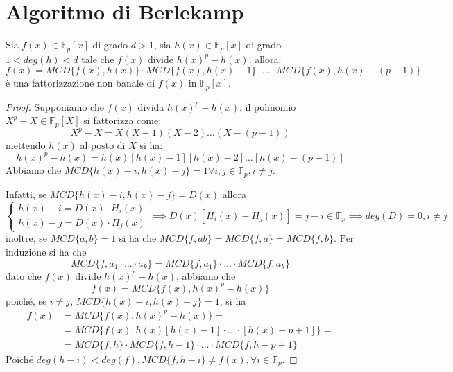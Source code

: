 \documentclass[10pt,a4paper,twoside]{book}
\begin{document}
\section{Algoritmo di Berlekamp}
\begin{theorem}
    Sia $f(x) \in \mathbb{F}_p[x]$ di grado $d > 1$, sia $h(x) \in \mathbb{F}_p[x]$ di grado $1 < deg(h) < d$ tale che $f(x)$ divide $h(x)^p - h(x)$. allora:
    \begin{equation*}
        f(x) = MCD\{f(x), h(x)\} \cdot MCD\{f(x), h(x) - 1\} \cdot \ldots \cdot MCD\{f(x), h(x) - (p - 1)\}
    \end{equation*}
    è una fattorizzazione non banale di $f(x)$ in $\mathbb{F}_p[x]$.
\end{theorem}
\begin{proof}
    Supponiamo che $f(x)$ divida $h(x)^p - h(x)$. il polinomio $X^p - X \in \mathbb{F}_p[X]$ si fattorizza come:
    \begin{equation*}
        X^p - X = X(X - 1)(X - 2)\ldots(X - (p - 1))
    \end{equation*}
    mettendo $h(x)$ al posto di $X$ si ha:
    \begin{equation*}
        h(x)^p - h(x) = h(x)[h(x) - 1][h(x) - 2]\ldots[h(x) - (p - 1)]
    \end{equation*}
    Abbiamo che $MCD\{ h(x) - i, h(x) - j\} = 1 \forall i,j \in \mathbb{F}_p, i \neq j$.

    Infatti, se $MCD\{ h(x) - i, h(x) - j\} = D(x)$ allora
    \begin{equation*}
        \begin{cases}
            h(x) - i = D(x) \cdot H_i(x) \\
            h(x) - j = D(x) \cdot H_j(x)
        \end{cases}
        \implies D(x)[H_i(x) - H_j(x)] = j - i \in \mathbb{F}_p
        \implies deg(D) = 0, i \neq j
    \end{equation*}
    inoltre, se $ MCD\{ a, b\} = 1$ si ha che $MCD\{ f, ab\} = MCD\{ f, a\} = MCD\{ f, b\} $. Per induzione si ha che
    \begin{equation*}
        MCD\{ f, a_1 \cdot \ldots \cdot a_k\} = MCD\{ f, a_1\} \cdot \ldots \cdot MCD\{ f, a_k\}
    \end{equation*}
    dato che $f(x)$ divide $h(x)^p - h(x)$, abbiamo che
    \begin{equation*}
        f(x) = MCD\{ f(x), h(x)^p - h(x)\}
    \end{equation*}
    poiché, se $i \neq j$, $MCD\{ h(x) - i, h(x) - j\} = 1$, si ha
    \begin{align*}
        f(x) & = MCD\{ f(x), h(x)^p - h(x)\} =                                               \\
             & = MCD\{ f(x), h(x)[h(x) - 1] \cdot \ldots \cdot [h(x) - p + 1]\} =            \\
             & = MCD\{ f, h\} \cdot MCD\{ f, h - 1\} \cdot \ldots \cdot MCD\{ f, h - p + 1\}
    \end{align*}
    Poiché $deg(h - i) < deg(f), MCD\{f, h - i\} \neq f(x), \forall i \in \mathbb{F}_p$.


\end{proof}
\end{document}
